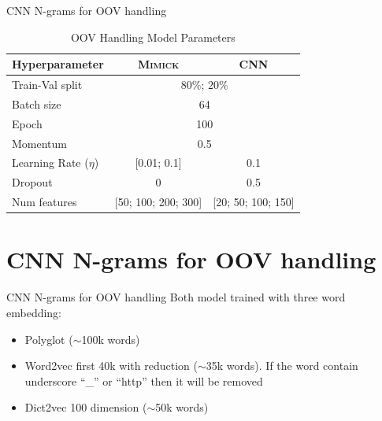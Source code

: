 \documentclass{beamer}
\begin{document}
\begin{frame}{CNN N-grams for OOV handling}

    \begin{table}[]
        \centering
        \caption{OOV Handling Model Parameters}
        \label{tab:hyperparameter}
        \begin{tabular}{@{}lcc@{}}
            \toprule
            \textbf{Hyperparameter} & \multicolumn{1}{c}{\textbf{\textsc{Mimick}}} & \multicolumn{1}{c}{\textbf{CNN}} \\ \midrule
            Train-Val split & \multicolumn{2}{c}{$80\%$; $20\%$}\\
            Batch size & \multicolumn{2}{c}{64} \\
            Epoch & \multicolumn{2}{c}{100} \\
            Momentum & \multicolumn{2}{c}{0.5} \\
            Learning Rate ($\eta$) & [0.01; 0.1] & 0.1 \\
            Dropout & 0 & 0.5 \\
            Num features & [50; 100; 200; 300] & [20; 50; 100; 150] \\ \bottomrule
        \end{tabular}
    \end{table}
\end{frame}

\section{CNN N-grams for OOV handling}
\begin{frame}{CNN N-grams for OOV handling}
    Both model trained with three word embedding:
    \begin{itemize}
        \item Polyglot ($\sim$100k words)
        \item Word2vec first 40k with reduction ($\sim$35k words). If the word
        contain underscore ``\_'' or ``http'' then it will be
        removed
        \item Dict2vec 100 dimension ($\sim$50k words)
    \end{itemize}
\end{frame}
\end{document}
